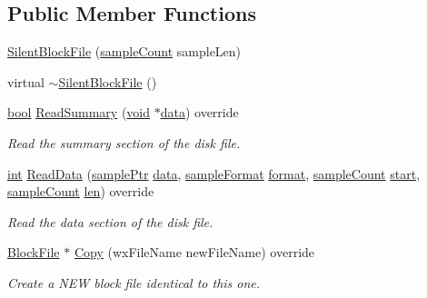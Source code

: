 \subsection*{Public Member Functions}
\begin{DoxyCompactItemize}
\item 
\hyperlink{class_silent_block_file_a735bf1f7eb77547499723327dbde248d}{Silent\+Block\+File} (\hyperlink{include_2audacity_2_types_8h_afa427e1f521ea5ec12d054e8bd4d0f71}{sample\+Count} sample\+Len)
\item 
virtual \hyperlink{class_silent_block_file_a7ee91def7b5d55f38f9c89e37a76f8cd}{$\sim$\+Silent\+Block\+File} ()
\item 
\hyperlink{mac_2config_2i386_2lib-src_2libsoxr_2soxr-config_8h_abb452686968e48b67397da5f97445f5b}{bool} \hyperlink{class_silent_block_file_a2b2a57a9473cb73f6e671ee304fd87d3}{Read\+Summary} (\hyperlink{sound_8c_ae35f5844602719cf66324f4de2a658b3}{void} $\ast$\hyperlink{lib_2expat_8h_ac39e72a1de1cb50dbdc54b08d0432a24}{data}) override
\begin{DoxyCompactList}\small\item\em Read the summary section of the disk file. \end{DoxyCompactList}\item 
\hyperlink{xmltok_8h_a5a0d4a5641ce434f1d23533f2b2e6653}{int} \hyperlink{class_silent_block_file_a80371366894075e0ce8ef5f09b5b09cc}{Read\+Data} (\hyperlink{include_2audacity_2_types_8h_aaafb46d1caf7c79262fec96b577215fe}{sample\+Ptr} \hyperlink{lib_2expat_8h_ac39e72a1de1cb50dbdc54b08d0432a24}{data}, \hyperlink{include_2audacity_2_types_8h_a9938d2e2f6adef23e745cd80ef379792}{sample\+Format} \hyperlink{_export_p_c_m_8cpp_a317afff57d87a89158c2b038d37b2b08}{format}, \hyperlink{include_2audacity_2_types_8h_afa427e1f521ea5ec12d054e8bd4d0f71}{sample\+Count} \hyperlink{seqread_8c_ac503262ae470564980711da4f78b1181}{start}, \hyperlink{include_2audacity_2_types_8h_afa427e1f521ea5ec12d054e8bd4d0f71}{sample\+Count} \hyperlink{lib_2expat_8h_af86d325fecfc8f47b61fbf5a5146f582}{len}) override
\begin{DoxyCompactList}\small\item\em Read the data section of the disk file. \end{DoxyCompactList}\item 
\hyperlink{class_block_file}{Block\+File} $\ast$ \hyperlink{class_silent_block_file_a6a2614cf88c47e75e2742f866826f1d4}{Copy} (wx\+File\+Name new\+File\+Name) override
\begin{DoxyCompactList}\small\item\em Create a N\+EW block file identical to this one. \end{DoxyCompactList}\item 

\end{DoxyCompactItemize}
